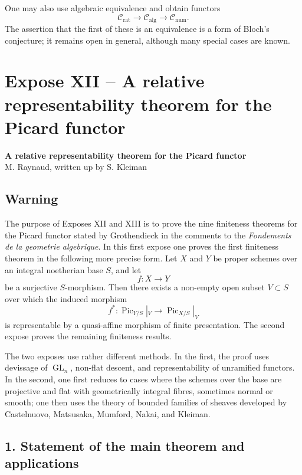 \documentclass[12pt]{article}
\newcommand{\Pic}{\operatorname{Pic}}
\newcommand{\Gl}{\operatorname{GL}}
\newcommand{\longto}{\longrightarrow}
\begin{document}
One may also use algebraic equivalence and obtain functors
\[
\mathcal C_{\mathrm{rat}}\longto\mathcal C_{\mathrm{alg}}\longto\mathcal C_{\mathrm{num}}.
\]
The assertion that the first of these is an equivalence is a form of Bloch's conjecture; it remains open in general, although many special cases are known.

\section*{Expose XII -- A relative representability theorem for the Picard functor}

\begin{center}
{\large\textbf{A relative representability theorem for the Picard functor}}\\[0.25em]
{\normalsize M. Raynaud, written up by S. Kleiman}
\end{center}

\subsection*{Warning}

The purpose of Exposes XII and XIII is to prove the nine finiteness theorems for the Picard functor stated by Grothendieck in the comments to the \emph{Fondements de la geometrie algebrique}. In this first expose one proves the first finiteness theorem in the following more precise form. Let $X$ and $Y$ be proper schemes over an integral noetherian base $S$, and let
\[
f:X\to Y
\]
be a surjective $S$-morphism. Then there exists a non-empty open subset $V\subset S$ over which the induced morphism
\[
f^*:\Pic_{Y/S}|_V\longto\Pic_{X/S}|_V
\]
is representable by a quasi-affine morphism of finite presentation. The second expose proves the remaining finiteness results.

The two exposes use rather different methods. In the first, the proof uses devissage of $\Gl_n$, non-flat descent, and representability of unramified functors. In the second, one first reduces to cases where the schemes over the base are projective and flat with geometrically integral fibres, sometimes normal or smooth; one then uses the theory of bounded families of sheaves developed by Castelnuovo, Matsusaka, Mumford, Nakai, and Kleiman.

\subsection*{1. Statement of the main theorem and applications}
\end{document}
